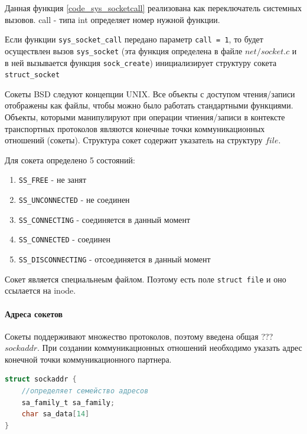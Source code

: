  

Данная функция \ref{code_sys_socketcall} реализована как переключатель системных вызовов. 
call - типа int определяет номер нужной функции.

 

Если функции \verb|sys_socket_call| передано параметр \verb|call = 1|, то будет осуществлен вызов \verb|sys_socket| (эта функция определена в файле $net/socket.c$ и в ней вызывается функция \verb|sock_create|) инициализирует структуру сокета \verb|struct_socket|

 

Сокеты BSD следуют концепции UNIX. Все объекты с доступом чтения/записи отображены как файлы, чтобы можно было работать стандартными функциями. Объекты, которыми манипулируют при операции чтиения/записи в контексте транспортных протоколов являются конечные точки коммуникационных отношений (сокеты). 
Структура сокет содержит указатель на структуру $file$. 

Для сокета определено 5 состояний:
\begin{enumerate}
	\item \verb|SS_FREE| - не занят
	\item \verb|SS_UNCONNECTED| - не соединен
	\item \verb|SS_CONNECTING| - соединяется в данный момент
	\item \verb|SS_CONNECTED| - соединен
	\item \verb|SS_DISCONNECTING| - отсоединяется в данный момент
\end{enumerate}

Сокет является специальнеым файлом. Поэтому есть поле \verb|struct file| и оно ссылается на inode. 

\paragraph{Адреса сокетов}

Сокеты поддерживают множество протоколов, поэтому введена общая ??? $sockaddr$. При создании коммуникационных отношений необходимо указать адрес конечной точки коммуникационного партнера. 

\begin{lstlisting}[language=c, caption = Структура sockaddr]
struct sockaddr {
	//определяет семейство адресов
	sa_family_t sa_family;
	char sa_data[14]
}
\end{lstlisting}

